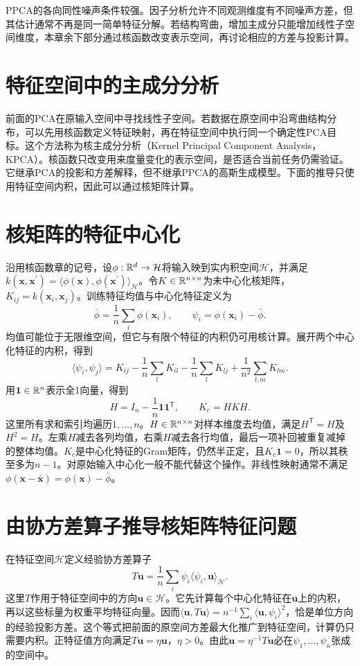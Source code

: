 PPCA的各向同性噪声条件较强。因子分析允许不同观测维度有不同噪声方差，但其估计通常不再是同一简单特征分解。若结构弯曲，增加主成分只能增加线性子空间维度，本章余下部分通过核函数改变表示空间，再讨论相应的方差与投影计算。


\section{特征空间中的主成分分析}
前面的PCA在原输入空间中寻找线性子空间。若数据在原空间中沿弯曲结构分布，可以先用核函数定义特征映射，再在特征空间中执行同一个确定性PCA目标。这个方法称为核主成分分析（Kernel Principal Component Analysis，KPCA）。核函数只改变用来度量变化的表示空间，是否适合当前任务仍需验证。它继承PCA的投影和方差解释，但不继承PPCA的高斯生成模型。下面的推导只使用特征空间内积，因此可以通过核矩阵计算。

\section{核矩阵的特征中心化}
沿用核函数章的记号，设$\phi:\mathbb{R}^d\to\mathcal H$将输入映到实内积空间$\mathcal H$，并满足$k(\bm x,\bm x^\prime)=\langle\phi(\bm x),\phi(\bm x^\prime)\rangle_{\mathcal H}$。令$K\in\mathbb{R}^{n\times n}$为未中心化核矩阵，$K_{ij}=k(\bm x_i,\bm x_j)$。训练特征均值与中心化特征定义为
\begin{equation}
 \bar\phi=\frac1n\sum_i\phi(\bm x_i),\qquad
 \psi_i=\phi(\bm x_i)-\bar\phi.
\end{equation}
均值可能位于无限维空间，但它与有限个特征的内积仍可用核计算。展开两个中心化特征的内积，得到
\begin{equation}
 \langle\psi_i,\psi_j\rangle
 =K_{ij}-\frac1n\sum_lK_{il}-\frac1n\sum_lK_{lj}
 +\frac1{n^2}\sum_{l,m}K_{lm}.
\end{equation}
用$\bm1\in\mathbb{R}^n$表示全1向量，得到
\begin{equation}
 H=I_n-\frac1n\bm1\bm1^{\mathsf T},\qquad K_c=HKH.
 \label{eq:kpca-centered-gram}
\end{equation}
这里所有求和索引均遍历$1,\ldots,n$。$H\in\mathbb{R}^{n\times n}$对样本维度去均值，满足$H^{\mathsf T}=H$及$H^2=H$。左乘$H$减去各列均值，右乘$H$减去各行均值，最后一项补回被重复减掉的整体均值。$K_c$是中心化特征的Gram矩阵，仍然半正定，且$K_c\bm1=0$，所以其秩至多为$n-1$。对原始输入中心化一般不能代替这个操作。非线性映射通常不满足$\phi(\bm x-\bar{\bm x})=\phi(\bm x)-\bar\phi$。

\section{由协方差算子推导核矩阵特征问题}
在特征空间$\mathcal H$定义经验协方差算子
\begin{equation}
 T\bm u=\frac1n\sum_i\psi_i\langle\psi_i,\bm u\rangle_{\mathcal H}.
 \label{eq:kpca-covariance-operator}
\end{equation}
这里$T$作用于特征空间中的方向$\bm u\in\mathcal H$。它先计算每个中心化特征在$\bm u$上的内积，再以这些标量为权重平均特征向量。因而$\langle\bm u,T\bm u\rangle=n^{-1}\sum_i\langle\bm u,\psi_i\rangle^2$，恰是单位方向的经验投影方差。这个等式把前面的原空间方差最大化推广到特征空间，计算仍只需要内积。正特征值方向满足$T\bm u=\eta\bm u$，$\eta>0$。由此$\bm u=\eta^{-1}T\bm u$必在$\psi_1,\ldots,\psi_n$张成的空间中。

